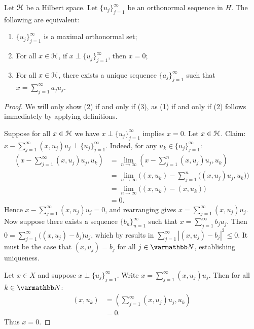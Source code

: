 \begin{theorem}\label{thm:hilbert-basis}
    Let $\mathcal{H}$ be a Hilbert space. Let $\{u_j\}_{j = 1}^\infty$ be an orthonormal sequence in $H$. The following are equivalent:
        \begin{enumerate}[label = (\arabic*),itemsep=1pt,topsep=3pt]
            \item $\{u_j\}_{j = 1}^\infty$ is a maximal orthonormal set;
            \item For all $x \in \mathcal{H}$, if $x \perp \{u_j\}_{j = 1}^\infty$, then $x = 0$;
            \item For all $x \in \mathcal{H}$, there exists a unique sequence $\{a_j\}_{j = 1}^\infty$ such that $x = \sum_{j = 1}^\infty a_j u_j$.
        \end{enumerate}
\end{theorem}
    \begin{proof}
        We will only show (2) if and only if (3), as (1) if and only if (2) follows immediately by applying definitions.

        Suppose for all $x \in \mathcal{H}$ we have $x \perp \{u_j\}_{j = 1}^\infty$ implies $x = 0$. Let $x \in \mathcal{H}$. Claim: $x - \sum_{j = 1}^\infty (x,u_j)u_j \perp \{u_j\}_{j = 1}^\infty$. Indeed, for any $u_k \in \{u_j\}_{j = 1}^\infty$:
            \begin{equation*}
            \begin{split}
                \left( x - \sum_{j = 1}^\infty (x,u_j)u_j , u_k \right)
                & = \lim_{n \rightarrow \infty} \left( x - \sum_{j = 1}^n (x,u_j)u_j, u_k \right) \\
                & = \lim_{n \rightarrow \infty}\biggl( (x,u_k) - \sum_{j = 1}^n\bigl( (x,u_j)u_j,u_k \bigr) \biggr) \\
                & = \lim_{n \rightarrow \infty}\bigl( (x,u_k) - (x,u_k)\bigr) \\
                & = 0.
            \end{split}
            \end{equation*}
        Hence $x - \sum_{j = 1}^\infty (x,u_j)u_j = 0$, and rearranging gives $x = \sum_{j = 1}^\infty (x,u_j)u_j$. Now suppose there exists a sequence $\{b_n\}_{n = 1}^\infty$ such that $x = \sum_{j = 1}^\infty b_j u_j$. Then $0 = \sum_{j = 1}^\infty \bigl((x,u_j) - b_j\bigr)u_j$, which by  results in $\sum_{j = 1}^\infty |(x,u_j) - b_j|^2 \leq 0$. It must be the case that $(x,u_j) = b_j$ for all $j \in \bfN$, establishing uniqueness.

        Let $x \in X$ and suppose $x \perp \{u_j\}_{j = 1}^\infty$. Write $x = \sum_{j = 1}^\infty (x,u_j)u_j$. Then for all $k \in \bfN$:
            \begin{equation*}
            \begin{split}
                (x,u_k)
                & = \left( \sum_{j = 1}^\infty (x,u_j)u_j , u_k \right) \\
                & = 0.
            \end{split}
            \end{equation*}
        Thus $x = 0$.
    \end{proof}

